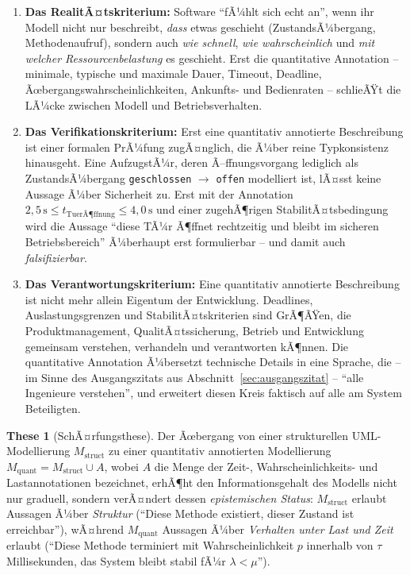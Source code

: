 ﻿\documentclass[a4paper,12pt]{report}
\theoremstyle{definition}
\newtheorem{these}{These}[section]
\begin{document}
\begin{enumerate}
  \item[(i)] \textbf{Das RealitÃ¤tskriterium:} Software ``fÃ¼hlt sich echt an'', wenn
  ihr Modell nicht nur beschreibt, \emph{dass} etwas geschieht (ZustandsÃ¼bergang,
  Methodenaufruf), sondern auch \emph{wie schnell}, \emph{wie wahrscheinlich} und
  \emph{mit welcher Ressourcenbelastung} es geschieht. Erst die quantitative
  Annotation -- minimale, typische und maximale Dauer, Timeout, Deadline,
  Ãœbergangswahrscheinlichkeiten, Ankunfts- und Bedienraten -- schlieÃŸt die LÃ¼cke
  zwischen Modell und Betriebsverhalten.

  \item[(ii)] \textbf{Das Verifikationskriterium:} Erst eine quantitativ annotierte
  Beschreibung ist einer formalen PrÃ¼fung zugÃ¤nglich, die Ã¼ber reine
  Typkonsistenz hinausgeht. Eine AufzugstÃ¼r, deren Ã–ffnungsvorgang lediglich als
  ZustandsÃ¼bergang \texttt{geschlossen} $\to$ \texttt{offen} modelliert ist, lÃ¤sst
  keine Aussage Ã¼ber Sicherheit zu. Erst mit der Annotation
  $2{,}5\,\text{s} \le t_{\text{TuerÃ¶ffnung}} \le 4{,}0\,\text{s}$ und einer
  zugehÃ¶rigen StabilitÃ¤tsbedingung wird die Aussage ``diese TÃ¼r Ã¶ffnet rechtzeitig
  und bleibt im sicheren Betriebsbereich'' Ã¼berhaupt erst formulierbar -- und damit
  auch \emph{falsifizierbar}.

  \item[(iii)] \textbf{Das Verantwortungskriterium:} Eine quantitativ annotierte
  Beschreibung ist nicht mehr allein Eigentum der Entwicklung. Deadlines,
  Auslastungsgrenzen und StabilitÃ¤tskriterien sind GrÃ¶ÃŸen, die Produktmanagement,
  QualitÃ¤tssicherung, Betrieb und Entwicklung gemeinsam verstehen, verhandeln und
  verantworten kÃ¶nnen. Die quantitative Annotation Ã¼bersetzt technische Details in
  eine Sprache, die -- im Sinne des Ausgangszitats aus
  Abschnitt~\ref{sec:ausgangszitat} -- ``alle Ingenieure verstehen'', und erweitert
  diesen Kreis faktisch auf alle am System Beteiligten.
\end{enumerate}

\begin{these}[SchÃ¤rfungsthese]
\label{these:schaerfung}
Der Ãœbergang von einer strukturellen UML-Modellierung
$M_{\mathrm{struct}}$ zu einer quantitativ annotierten Modellierung
$M_{\mathrm{quant}} = M_{\mathrm{struct}} \cup A$, wobei $A$ die Menge der
Zeit-, Wahrscheinlichkeits- und Lastannotationen bezeichnet, erhÃ¶ht den
Informationsgehalt des Modells nicht nur graduell, sondern verÃ¤ndert dessen
\emph{epistemischen Status}: $M_{\mathrm{struct}}$ erlaubt Aussagen Ã¼ber
\emph{Struktur} (``Diese Methode existiert, dieser Zustand ist erreichbar''),
wÃ¤hrend $M_{\mathrm{quant}}$ Aussagen Ã¼ber \emph{Verhalten unter Last und Zeit}
erlaubt (``Diese Methode terminiert mit Wahrscheinlichkeit $p$ innerhalb von
$\tau$ Millisekunden, das System bleibt stabil fÃ¼r $\lambda < \mu$'').
\end{these}
\end{document}
